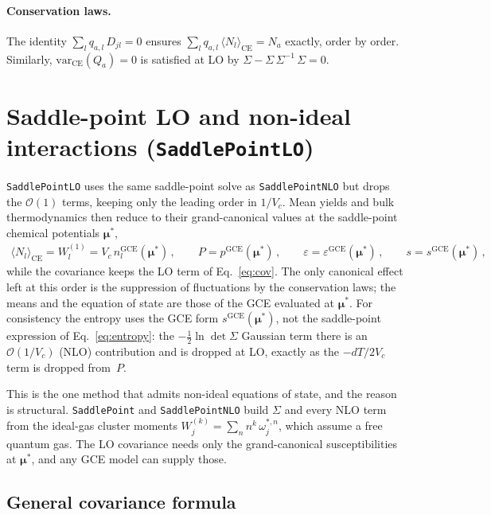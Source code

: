 \documentclass[11pt]{article}
\newcommand{\bmu}{\bm{\mu}}
\newcommand{\CE}{\mathrm{CE}}
\newcommand{\GCE}{\mathrm{GCE}}
\newcommand{\varr}{\mathrm{var}}
\begin{document}
\paragraph{Conservation laws.}
The identity $\sum_l q_{a,l}\,D_{jl} = 0$ ensures $\sum_l q_{a,l}\,\langle N_l\rangle_\CE = N_a$ exactly, order by order.
Similarly, $\varr_\CE(Q_a) = 0$ is satisfied at LO by $\Sigma - \Sigma\,\Sigma^{-1}\,\Sigma = 0$.


\section{Saddle-point LO and non-ideal interactions (\texttt{SaddlePointLO})}
\label{sec:SPLO}

\texttt{SaddlePointLO} uses the same saddle-point solve as \texttt{SaddlePointNLO} but drops the $\mathcal{O}(1)$ terms, keeping only the leading order in $1/V_c$.
Mean yields and bulk thermodynamics then reduce to their grand-canonical values at the saddle-point chemical potentials $\bmu^*$,
\begin{align}
  \langle N_l\rangle_\CE = W_l^{(1)} = V_c\,n_l^{\GCE}(\bmu^*) \,, \qquad
  P = p^{\GCE}(\bmu^*) \,, \qquad
  \varepsilon = \varepsilon^{\GCE}(\bmu^*) \,, \qquad
  s = s^{\GCE}(\bmu^*) \,,
\end{align}
while the covariance keeps the LO term of Eq.~\eqref{eq:cov}.
The only canonical effect left at this order is the suppression of fluctuations by the conservation laws; the means and the equation of state are those of the GCE evaluated at $\bmu^*$.
For consistency the entropy uses the GCE form $s^{\GCE}(\bmu^*)$, not the saddle-point expression of Eq.~\eqref{eq:entropy}: the $-\tfrac12\ln\det\Sigma$ Gaussian term there is an $\mathcal{O}(1/V_c)$ (NLO) contribution and is dropped at LO, exactly as the $-dT/2V_c$ term is dropped from~$P$.

This is the one method that admits non-ideal equations of state, and the reason is structural.
\texttt{SaddlePoint} and \texttt{SaddlePointNLO} build $\Sigma$ and every NLO term from the ideal-gas cluster moments $W_j^{(k)} = \sum_n n^k\,\omega_j^{*,n}$, which assume a free quantum gas.
The LO covariance needs only the grand-canonical susceptibilities at $\bmu^*$, and any GCE model can supply those.

\subsection{General covariance formula}
\end{document}
